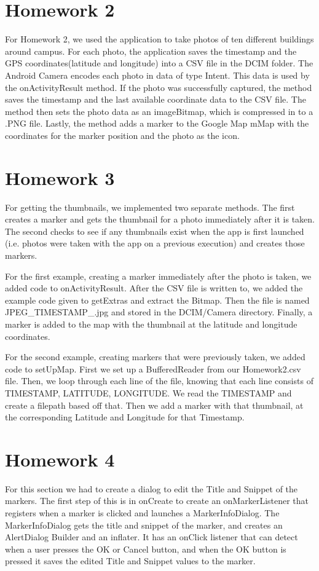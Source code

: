 \documentclass[]{article}
\begin{document}
\section{Homework 2}
For Homework 2, we used the application to take photos of ten different buildings around campus. For each photo, the application saves the timestamp and the GPS coordinates(latitude and longitude) into a CSV file in the DCIM folder. The Android Camera encodes each photo in data of type Intent. This data is used by the onActivityResult method. If the photo was successfully captured, the method saves the timestamp and the last available coordinate data to the CSV file. The method then sets the photo data as an imageBitmap, which is compressed in to a .PNG file. Lastly, the method adds a marker to the Google Map mMap with the coordinates for the marker position and the photo as the icon.

\section{Homework 3}
For getting the thumbnails, we implemented two separate methods. The first creates a marker and gets the thumbnail for a photo immediately after it is taken. The second checks to see if any thumbnails exist when the app is first launched (i.e. photos were taken with the app on a previous execution) and creates those markers.

For the first example, creating a marker immediately after the photo is taken, we added code to onActivityResult. After the CSV file is written to, we added the example code given to getExtras and extract the Bitmap. Then the file is named JPEG\_TIMESTAMP\_.jpg and stored in the DCIM/Camera directory. Finally, a marker is added to the map with the thumbnail at the latitude and longitude coordinates.

For the second example, creating markers that were previously taken, we added code to setUpMap. First we set up a BufferedReader from our Homework2.csv file. Then, we loop through each line of the file, knowing that each line consists of TIMESTAMP, LATITUDE, LONGITUDE. We read the TIMESTAMP and create a filepath based off that. Then we add a marker with that thumbnail, at the corresponding Latitude and Longitude for that Timestamp. 

\section{Homework 4}
For this section we had to create a dialog to edit the Title and Snippet of the markers. The first step of this is in onCreate to create an onMarkerListener that registers when a marker is clicked and launches a MarkerInfoDialog. The MarkerInfoDialog gets the title and snippet of the marker, and creates an AlertDialog Builder and an inflater. It has an onClick listener that can detect when a user presses the OK or Cancel button, and when the OK button is pressed it saves the edited Title and Snippet values to the marker. 
\end{document}
